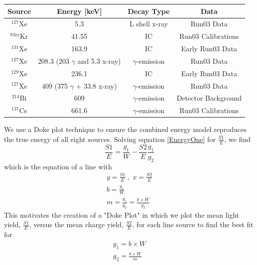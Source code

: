 \documentclass[a4paper,12pt]{article}
\begin{document}
{\begin{center}
\begin{tabular}{ | c| c | c | c | }
\hline
Source & Energy [keV] & Decay Type & Data \\ \hline
$^{127}$Xe & 5.3 & L shell x-ray & Run03 Data \\ \hline
$^{83m}$Kr & 41.55 & IC & Run03 Calibrations \\  \hline
$^{131}$Xe & 163.9 & IC & Early Run03 Data \\  \hline
$^{127}$Xe & 208.3 (203 $\gamma$ and 5.3 x-ray) & $\gamma$-emission & Run03 Data \\  \hline
$^{129}$Xe & 236.1 & IC & Early Run03 Data  \\  \hline
$^{127}$Xe & 409 (375 $\gamma$ + 33.8 x-ray) & $\gamma$-emission & Run03 Data \\  \hline
$^{214}$Bi & 609 & $\gamma$-emission & Detector Background \\  \hline
$^{137}$Cs & 661.6 & $\gamma$-emission & Run03 Calibrations \\
\hline
\end{tabular}
\label{sources}
\end{center}

We use a Doke plot technique to ensure the combined energy model reproduces the true energy of all eight sources. \cite{Doke,Dobi}  Solving equation \ref{EnergyOne} for $\frac{S1}{E}$, we find
\begin{equation}\label{four}
\frac{S1}{E} = \frac{g_1}{W} - \frac{S2}{E}\frac{g_1}{g_2}
\end{equation}
which is the equation of a line with
\begin{subequations}
\begin{align}
y=\frac{S1}{E} \; , \; x=\frac{S2}{E} \\
b=\frac{g_1}{W} \\
m=\frac{g_1}{g_2}=\frac{b \times W}{g_2}
\end{align}
\end{subequations}
This motivates the creation of a "Doke Plot" in which we plot the mean light yield, $\frac{S1}{E}$, versus the mean charge yield, $\frac{S2}{E}$, for each line source to find the best fit for
\begin{subequations}\label{six}
\begin{align}
g_1 = b \times W \\
g_2 = \frac{b \times W}{m}
\end{align}
\end{subequations}

}
\end{document}
